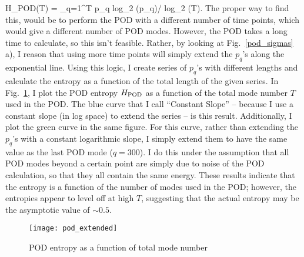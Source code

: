 \beq
H_{{\rm{POD}}}(T) = \sum_{q=1}^T p_q {\rm{log}}_2 (p_q)/ {\rm{log}}_2 (T).
\eeq
The proper way to find this, would be to perform the POD with a different number of time points, which would give a different number of POD modes. However, the POD takes a long time to calculate,
so this isn't feasible. Rather, by looking at Fig.~\ref{pod_sigmas} a), I reason that using more time points will simply extend the $p_q$'s along the exponential line. Using this logic, I create
series of $p_q$'s with different lengths and calculate the entropy as a function of the total length of the given series. In Fig.~\ref{pod_extended}, I plot the POD entropy $H_{{\rm{POD}}}$
as a function of the total mode number $T$ used in the POD. The blue curve that I call ``Constant Slope'' -- because I use a constant slope (in log space) to extend the series -- is this result.
Additionally, I plot the green curve in the same figure. For this curve, rather than extending the $p_q$'s with a constant logarithmic slope, I simply extend them to have the same value as the last
POD mode ($q=300$). I do this under the assumption that all POD modes beyond a certain point are simply due to noise of the POD calculation, so that they all contain the same energy.
These results indicate that the entropy is a function of the number of modes used in the POD; however, the entropies appear to level off at high $T$, suggesting that the actual
entropy may be the asymptotic value of $\sim 0.5$.

\begin{figure}[!ht]
\centerline{\texttt{[image: pod\_extended]}}
\caption{POD entropy as a function of total mode number}
\label{pod_extended}
\end{figure}
